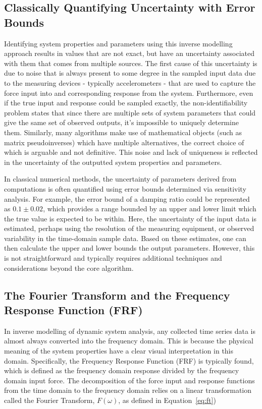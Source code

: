 \documentclass[12pt]{article}
\begin{document}
    \subsection{Classically Quantifying Uncertainty with Error Bounds}
    Identifying system properties and parameters using this inverse modelling approach results in values that are not exact, but have an uncertainty associated with them that comes from multiple sources.
    The first cause of this uncertainty is due to noise that is always present to some degree in the sampled input data due to the measuring devices - typically accelerometers - that are used to capture the force input into and corresponding response from the system.
    Furthermore, even if the true input and response could be sampled exactly, the non-identifiability problem states that since there are multiple sets of system parameters that could give the same set of observed outputs, it's impossible to uniquely determine them.
    Similarly, many algorithms make use of mathematical objects (such as matrix pseudoinverses) which have multiple alternatives, the correct choice of which is arguable and not definitive.
    This noise and lack of uniqueness is reflected in the uncertainty of the outputted system properties and parameters.

    In classical numerical methods, the uncertainty of parameters derived from computations is often quantified using error bounds determined via sensitivity analysis.
    For example, the error bound of a damping ratio could be represented as $0.1 \pm 0.02$, which provides a range bounded by an upper and lower limit which the true value is expected to be within.
    Here, the uncertainty of the input data is estimated, perhaps using the resolution of the measuring equipment, or observed variability in the time-domain sample data.
    Based on these estimates, one can then calculate the upper and lower bounds the output parameters.
    However, this is not straightforward and typically requires additional techniques and considerations beyond the core algorithm.


    \subsection{The Fourier Transform and the Frequency Response Function (FRF)}

    In inverse modelling of dynamic system analysis, any collected time series data is almost always converted into the frequency domain.
    This is because the physical meaning of the system properties have a clear visual interpretation in this domain.
    Specifically, the Frequency Response Function (FRF) is typically found, which is defined as the frequency domain response divided by the frequency domain input force.%
    The decomposition of the force input and response functions from the time domain to the frequency domain relies on a linear transformation called the Fourier Transform, $F(\omega)$, as defined in Equation~\ref{eq:ft})
\end{document}
